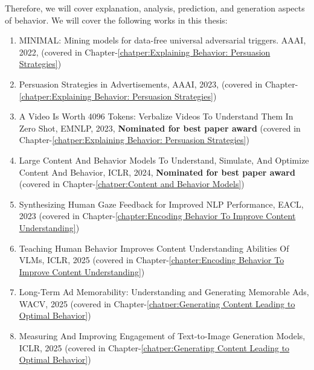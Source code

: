 Therefore, we will cover explanation, analysis, prediction, and generation aspects of behavior. We will cover the following works in this thesis:
\begin{enumerate}
    \item MINIMAL: Mining models for data-free universal adversarial triggers. AAAI, 2022, (covered in Chapter-\ref{chatper:Explaining Behavior: Persuasion Strategies})

    \item Persuasion Strategies in Advertisements, AAAI, 2023, (covered in Chapter-\ref{chatper:Explaining Behavior: Persuasion Strategies})

    \item A Video Is Worth 4096 Tokens: Verbalize Videos To Understand Them In Zero Shot, EMNLP, 2023, \textbf{Nominated for best paper award} (covered in Chapter-\ref{chatper:Explaining Behavior: Persuasion Strategies})

    \item Large Content And Behavior Models To Understand, Simulate, And Optimize Content And Behavior, ICLR, 2024, \textbf{Nominated for best paper award} (covered in Chapter-\ref{chatper:Content and Behavior Models})
    
    \item Synthesizing Human Gaze Feedback for Improved NLP Performance, EACL, 2023 (covered in Chapter-\ref{chapter:Encoding Behavior To Improve Content Understanding})

    \item Teaching Human Behavior Improves Content Understanding Abilities Of VLMs, ICLR, 2025 (covered in Chapter-\ref{chapter:Encoding Behavior To Improve Content Understanding})

    \item Long-Term Ad Memorability: Understanding and Generating Memorable Ads, WACV, 2025 (covered in Chapter-\ref{chatper:Generating Content Leading to Optimal Behavior})

    \item Measuring And Improving Engagement of Text-to-Image Generation Models, ICLR, 2025 (covered in Chapter-\ref{chatper:Generating Content Leading to Optimal Behavior})
\end{enumerate}



